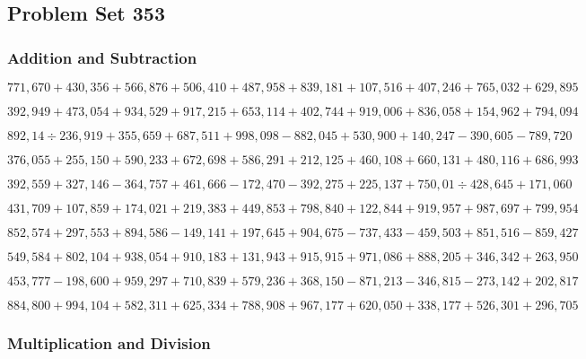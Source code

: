 \hypertarget{problem-set-353}{%
\subsection{Problem Set 353}\label{problem-set-353}}

\hypertarget{addition-and-subtraction}{%
\subsubsection{Addition and
Subtraction}\label{addition-and-subtraction}}

\(771,670+430,356+566,876+506,410+487,958+839,181+107,516+407,246+765,032+629,895\)

\(392,949+473,054+934,529+917,215+653,114+402,744+919,006+836,058+154,962+794,094\)

\(892,14÷236,919+355,659+687,511+998,098-882,045+530,900+140,247-390,605-789,720\)

\(376,055+255,150+590,233+672,698+586,291+212,125+460,108+660,131+480,116+686,993\)

\(392,559+327,146-364,757+461,666-172,470-392,275+225,137+750,01÷428,645+171,060\)

\(431,709+107,859+174,021+219,383+449,853+798,840+122,844+919,957+987,697+799,954\)

\(852,574+297,553+894,586-149,141+197,645+904,675-737,433-459,503+851,516-859,427\)

\(549,584+802,104+938,054+910,183+131,943+915,915+971,086+888,205+346,342+263,950\)

\(453,777-198,600+959,297+710,839+579,236+368,150-871,213-346,815-273,142+202,817\)

\(884,800+994,104+582,311+625,334+788,908+967,177+620,050+338,177+526,301+296,705\)

\hypertarget{multiplication-and-division}{%
\subsubsection{Multiplication and
Division}\label{multiplication-and-division}}

